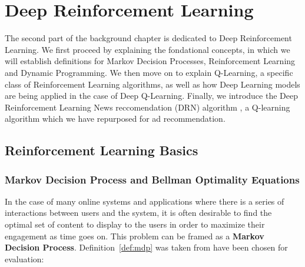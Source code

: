 \documentclass{mldsmsc}
\begin{document}
\section{Deep Reinforcement Learning}

The second part of the background chapter is dedicated to Deep Reinforcement Learning. We first
proceed by explaining the fondational concepts, in which we will establish definitions for
Markov Decision Processes, Reinforcement Learning and Dynamic Programming. We then move on to explain
Q-Learning, a specific class of Reinforcement Learning algorithms, as well as how Deep Learning
models are being applied in the case of Deep Q-Learning. Finally, we introduce the Deep Reinforcement
Learning News reccomendation (DRN) algorithm \citep{RefWorks:zheng2018drn:}, a Q-learning algorithm
which we have repurposed for ad recommendation.

\subsection{Reinforcement Learning Basics}

\subsubsection{Markov Decision Process and Bellman Optimality Equations}

In the case of many online systems and applications where there is a series of interactions between
users and the system, it is often desirable to find the optimal set of content to display to the
users in order to maximize their engagement as time goes on. This problem can be framed as a
\textbf{Markov Decision Process}. Definition~\ref{def:mdp} was taken from \citep{pike-burke2024LearnigAgents}
have been chosen for evaluation:
\end{document}

